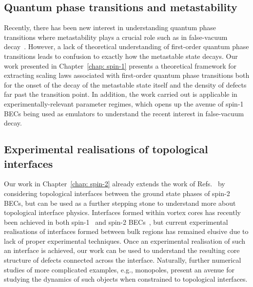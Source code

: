 \subsection{Quantum phase transitions and metastability}
Recently, there has been new interest in understanding quantum phase transitions
where metastability plays a crucial role such as in false-vacuum
decay~\cite{Billam2022,Song2022, Zenesini2023, Lagnese2023}.
However, a lack of theoretical understanding of first-order quantum phase
transitions leads to confusion to exactly how the metastable state decays.
Our work presented in Chapter~\ref{chap: spin-1} presents a theoretical
framework for extracting scaling laws associated with first-order quantum phase
transitions both for the onset of the decay of the metastable state itself and
the density of defects far past the transition point.
In addition, the work carried out is applicable in experimentally-relevant
parameter regimes, which opens up the avenue of spin-1 BECs being used as
emulators to understand the recent interest in false-vacuum decay.

\subsection{Experimental realisations of topological interfaces}
Our work in Chapter~\ref{chap: spin-2} already extends the work of
Refs.~\cite{Borgh2012, Borgh2013, Borgh2014} by considering topological
interfaces between the ground state phases of spin-2 BECs, but can be used as
a further stepping stone to understand more about topological interface physics.
Interfaces formed within vortex cores has recently been achieved in both
spin-1~\cite{Weiss2019,Xiao2021} and spin-2 BECs~\cite{Xiao2022}, but current
experimental realisations of interfaces formed between bulk regions has remained
elusive due to lack of proper experimental techniques.
Once an experimental realisation of such an interface is achieved, our work
can be used to understand the resulting core structure of defects connected
across the interface.
Naturally, further numerical studies of more complicated examples, e.g.,
monopoles, present an avenue for studying the dynamics of such objects when
constrained to topological interfaces.


